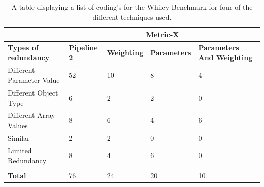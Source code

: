 \begin{table}[]
\centering
\begin{tabular}{|l|l|l|l|l|}
\hline
                             & \multicolumn{4}{c|}{\textbf{Metric-X}}                                                              \\ \hline
\textbf{Types of redundancy} & \textbf{Pipeline 2} & \textbf{Weighting} & \textbf{Parameters} & \textbf{Parameters  And Weighting} \\ \hline
Different Parameter Value    & 52                  & 10                 & 8                   & 4                                  \\ \hline
Different Object Type        & 6                   & 2                  & 2                   & 0                                  \\ \hline
Different Array Values       & 8                   & 6                  & 4                   & 6                                  \\ \hline
Similar                      & 2                   & 2                  & 0                   & 0                                  \\ \hline
Limited Redundancy           & 8                   & 4                  & 6                   & 0                                  \\ \hline
\textbf{}                    &                     &                    &                     &                                    \\ \hline
\textbf{Total}               & 76                  & 24                 & 20                  & 10                                 \\ \hline
\end{tabular}
\caption{A table displaying a list of coding's for the Whiley Benchmark for four of the different techniques used.}
\label{metriccoding}
\end{table}

